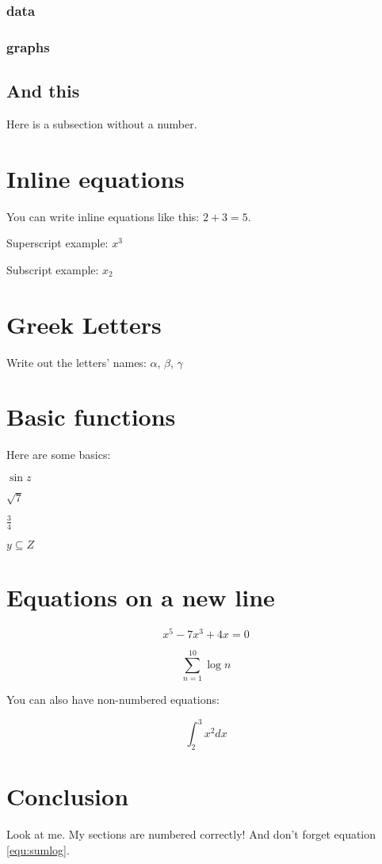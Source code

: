 \subsubsection{data}










\subsubsection{graphs}

\subsection*{And this}
Here is a subsection without a number.

\section{Inline equations}
You can write inline equations like this: $ 2 + 3 = 5$.  %

Superscript example: $x^{3}$ 

Subscript example: $x_{2}$

\section{Greek Letters}
Write out the letters' names: $\alpha$, $\beta$, $\gamma$  %

\section{Basic functions}
Here are some basics:

$\sin{z}$

$\sqrt{7}$

$\frac{3}{4}$

$y \subseteq Z$

\section{Equations on a new line}

\begin{equation}
x^5 - 7x^3 + 4x = 0
\end{equation}

\begin{equation}
\sum_{n=1}^{10} \log{n}
\label{equ:sumlog}
\end{equation}

You can also have non-numbered equations:

\begin{equation*}
\int_{2}^{3} x^2 dx
\end{equation*}

\section{Conclusion}
Look at me.  My sections are numbered correctly! And don't forget equation \ref{equ:sumlog}.

